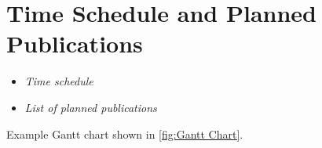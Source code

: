 \section{Time Schedule and Planned Publications}
\label{sec:Time Schedule and Planned Publications}

\begin{itemize}
	\item \emph{Time schedule}
	\item \emph{List of planned publications}
\end{itemize}

Example Gantt chart shown in \cref{fig:Gantt Chart}.

